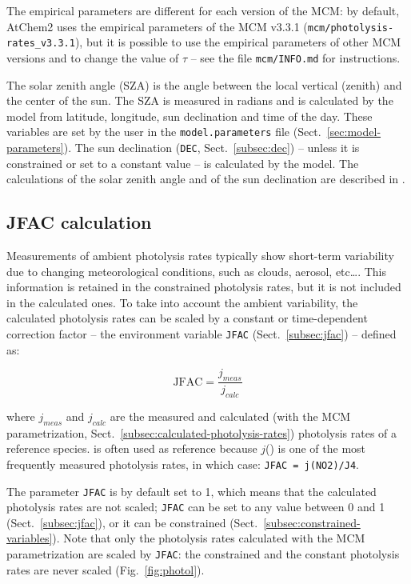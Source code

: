 The empirical parameters are different for each version of the MCM: by
default, AtChem2 uses the empirical parameters of the MCM v3.3.1
(\texttt{mcm/photolysis-rates\_v3.3.1}), but it is possible to use the
empirical parameters of other MCM versions and to change the value of
$\tau$ -- see the file \texttt{mcm/INFO.md} for instructions.

The solar zenith angle (SZA) is the angle between the local vertical
(zenith) and the center of the sun. The SZA is measured in radians and
is calculated by the model from latitude, longitude, sun declination
and time of the day. These variables are set by the user in the
\texttt{model.parameters} file (Sect.~\ref{sec:model-parameters}). The
sun declination (\texttt{DEC}, Sect.~\ref{subsec:dec}) -- unless it is
constrained or set to a constant value -- is calculated by the
model. The calculations of the solar zenith angle and of the sun
declination are described in \citet{madronich_1993}.

\subsection{JFAC calculation} \label{subsec:jfac-calculation}

Measurements of ambient photolysis rates typically show short-term
variability due to changing meteorological conditions, such as clouds,
aerosol, etc\ldots \citep{sommariva_2020}. This information is
retained in the constrained photolysis rates, but it is not included
in the calculated ones. To take into account the ambient variability,
the calculated photolysis rates can be scaled by a constant or
time-dependent correction factor -- the environment variable
\texttt{JFAC} (Sect.~\ref{subsec:jfac}) -- defined as:

\begin{equation}
  \mathrm{JFAC} = \frac{j_{meas}}{j_{calc}}
\end{equation}

where $j_{meas}$ and $j_{calc}$ are the measured and calculated (with
the MCM parametrization, Sect.~\ref{subsec:calculated-photolysis-rates})
photolysis rates of a reference species.  is often used as
reference because $j$() is one of the most frequently measured
photolysis rates, in which case: \verb|JFAC = j(NO2)/J4|.

The parameter \texttt{JFAC} is by default set to 1, which means that
the calculated photolysis rates are not scaled; \texttt{JFAC} can be
set to any value between 0 and 1 (Sect.~\ref{subsec:jfac}), or it can
be constrained (Sect.~\ref{subsec:constrained-variables}). Note that
only the photolysis rates calculated with the MCM parametrization are
scaled by \texttt{JFAC}: the constrained and the constant photolysis
rates are never scaled (Fig.~\ref{fig:photol}).

